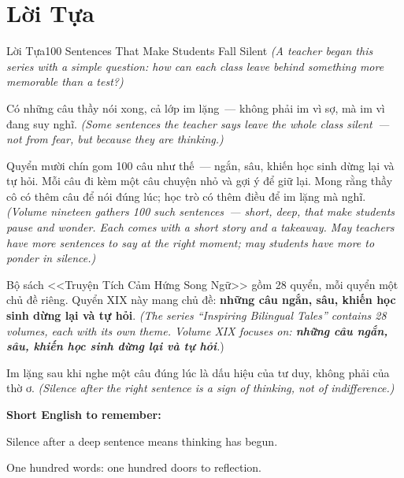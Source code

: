 \chapter*{Lời Tựa}

\begin{truyen}{Lời Tựa}{100 Sentences That Make Students Fall Silent}
\textit{(A teacher began this series with a simple question: how can each class leave behind something more memorable than a test?)}

Có những câu thầy nói xong, cả lớp im lặng~--- không phải im vì sợ, mà im vì đang suy nghĩ.
\textit{(Some sentences the teacher says leave the whole class silent~--- not from fear, but because they are thinking.)}

Quyển mười chín gom 100 câu như thế~--- ngắn, sâu, khiến học sinh dừng lại và tự hỏi. Mỗi câu đi kèm một câu chuyện nhỏ và gợi ý để giữ lại. Mong rằng thầy cô có thêm câu để nói đúng lúc; học trò có thêm điều để im lặng mà nghĩ.
\textit{(Volume nineteen gathers 100 such sentences~--- short, deep, that make students pause and wonder. Each comes with a short story and a takeaway. May teachers have more sentences to say at the right moment; may students have more to ponder in silence.)}

Bộ sách <<Truyện Tích Cảm Hứng Song Ngữ>> gồm 28 quyển, mỗi quyển một chủ đề riêng. Quyển XIX này mang chủ đề: \textbf{những câu ngắn, sâu, khiến học sinh dừng lại và tự hỏi}.
\textit{(The series ``Inspiring Bilingual Tales'' contains 28 volumes, each with its own theme. Volume XIX focuses on: \textbf{những câu ngắn, sâu, khiến học sinh dừng lại và tự hỏi}.})
\end{truyen}

\begin{baihoc}
Im lặng sau khi nghe một câu đúng lúc là dấu hiệu của tư duy, không phải của thờ ơ.
\textit{(Silence after the right sentence is a sign of thinking, not of indifference.)}
\end{baihoc}

\begin{ghinhoanh}
\textbf{Short English to remember:}

Silence after a deep sentence means thinking has begun.

One hundred words: one hundred doors to reflection.
\end{ghinhoanh}

